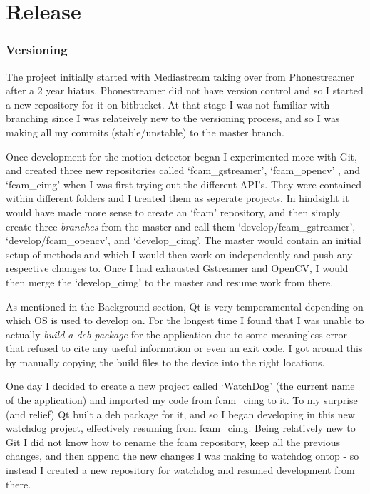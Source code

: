 \documentclass[11pt]{article} %
\begin{document}
\part{Release}

\section{Versioning}
The project initially started with Mediastream taking over from Phonestreamer after a  2 year hiatus. Phonestreamer did not have version control and so I started a new repository for it on bitbucket. At that stage I was not familiar with branching since I was relateively new to the versioning process, and so I was making all my commits (stable/unstable) to the master branch.

Once development for the motion detector began I experimented more with Git, and created three new repositories called ‘fcam\_gstreamer’, ‘fcam\_opencv’ , and ‘fcam\_cimg’  when I was first trying out the different API’s. They were contained within different folders and I treated them as seperate projects. In hindsight it would have made more sense to create an ‘fcam’ repository, and then simply create three {\it branches} from the master and call them ‘develop/fcam\_gstreamer’, ‘develop/fcam\_opencv’, and ‘develop\_cimg’. The master would contain an initial setup of methods and which I would then work on independently and push any respective changes to. Once I had exhausted Gstreamer and OpenCV, I would then merge the ‘develop\_cimg’ to the master and resume work from there.

As mentioned in the Background section, Qt is very temperamental depending on which OS is used to develop on. For the longest time I found that I was unable to actually {\it build a deb package} for the application due to some meaningless error that refused to cite any useful information or even an exit code. I got around this by manually copying the build files to the device into the right locations.

One day I decided to create a new project called ‘WatchDog’ (the current name of the application) and imported my code from fcam\_cimg to it. To my surprise (and relief) Qt built a deb package for it, and so I began developing in this new watchdog project, effectively resuming from fcam\_cimg. Being relatively new to Git I did not know how to rename the fcam repository, keep all the previous changes, and then append the new changes I was making to watchdog ontop - so instead I created a new repository for watchdog and resumed development from there.
\end{document}
